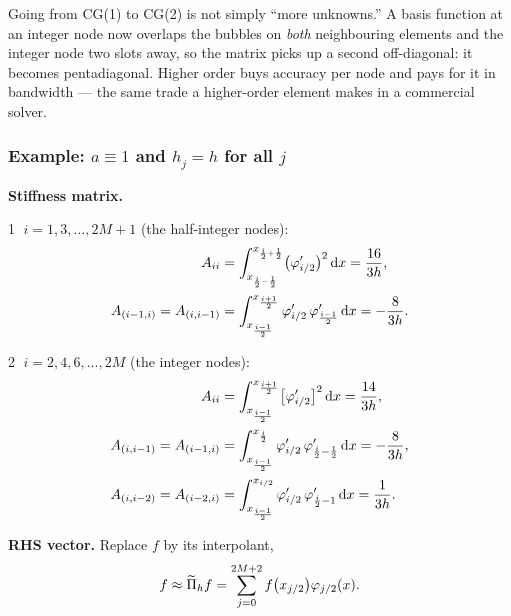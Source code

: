 \begin{pitfall}
Going from CG(1) to CG(2) is not simply ``more unknowns.'' A basis function at
an integer node now overlaps the bubbles on \emph{both} neighbouring elements
and the integer node two slots away, so the matrix picks up a second
off-diagonal: it becomes pentadiagonal. Higher order buys accuracy per node and
pays for it in bandwidth --- the same trade a higher-order element makes in a
commercial solver.
\end{pitfall}

\subsubsection*{Example: $a\equiv1$ and $h_{j}=h$ for all $j$}

\noindent\textbf{Stiffness matrix.}

\medskip
\textcircled{\scriptsize1}\; $i=1,3,\dots,2M+1$ (the half-integer nodes):
\begin{align}
  A_{ii}&=\int_{x_{\frac{i}{2}-\frac12}}^{x_{\frac{i}{2}+\frac12}}
          \bigl(\varphi'_{i/2}\bigr)^{2}\,\mathrm{d} x=\frac{16}{3h},
          \label{eq:l10Aodd}\\[0.4ex]
  A_{(i-1,i)}=A_{(i,i-1)}&=\int_{x_{\frac{i-1}{2}}}^{x_{\frac{i+1}{2}}}
          \varphi'_{i/2}\,\varphi'_{\frac{i-1}{2}}\,\mathrm{d} x=-\frac{8}{3h}.
          \label{eq:l10Aoddoff}
\end{align}

\textcircled{\scriptsize2}\; $i=2,4,6,\dots,2M$ (the integer nodes):
\begin{align}
  A_{ii}&=\int_{x_{\frac{i-1}{2}}}^{x_{\frac{i+1}{2}}}
          \bigl[\varphi'_{i/2}\bigr]^{2}\,\mathrm{d} x=\frac{14}{3h},
          \label{eq:l10Aeven}\\[0.4ex]
  A_{(i,i-1)}=A_{(i-1,i)}&=\int_{x_{\frac{i-1}{2}}}^{x_{\frac{i}{2}}}
          \varphi'_{i/2}\,\varphi'_{\frac{i}{2}-\frac12}\,\mathrm{d} x=-\frac{8}{3h},
          \label{eq:l10Aevenoff1}\\[0.4ex]
  A_{(i,i-2)}=A_{(i-2,i)}&=\int_{x_{\frac{i-1}{2}}}^{x_{i/2}}
          \varphi'_{i/2}\,\varphi'_{\frac{i}{2}-1}\,\mathrm{d} x=\frac{1}{3h}.
          \label{eq:l10Aevenoff2}
\end{align}

\medskip\noindent\textbf{RHS vector.} Replace $f$ by its interpolant,
\begin{equation}\label{eq:l10fint}
  f\approx\widetilde{\Pi}_h f=\sum_{j=0}^{2M+2}f\bigl(x_{j/2}\bigr)\varphi_{j/2}(x).
\end{equation}

